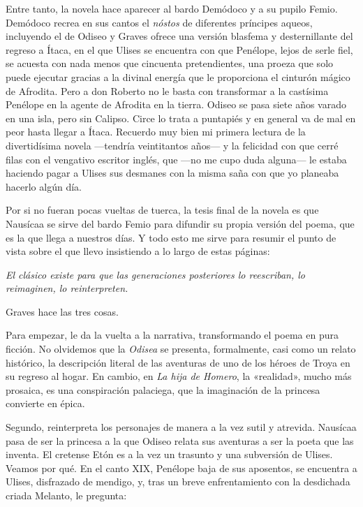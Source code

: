 Entre tanto, la novela hace aparecer al bardo Demódoco y a su pupilo Femio. Demódoco recrea en sus cantos el \emph{nóstos} de diferentes príncipes aqueos, incluyendo el de Odiseo y Graves ofrece una versión blasfema y desternillante del regreso a Ítaca, en el que Ulises se encuentra con que Penélope, lejos de serle fiel, se acuesta con nada menos que cincuenta pretendientes, una proeza que solo puede ejecutar gracias a la divinal energía que le proporciona el cinturón mágico de Afrodita. Pero a don Roberto no le basta con transformar a la castísima Penélope en la agente de Afrodita en la tierra. Odiseo se pasa siete años varado en una isla, pero sin Calipso. Circe lo trata a puntapiés y en general va de mal en peor hasta llegar a Ítaca. Recuerdo muy bien mi primera lectura de la divertidísima novela ---tendría veintitantos años--- y la felicidad con que cerré filas con el vengativo escritor inglés, que ---no me cupo duda alguna--- le estaba haciendo pagar a Ulises sus desmanes con la misma saña con que yo planeaba hacerlo algún día.

Por si no fueran pocas vueltas de tuerca, la tesis final de la novela es que Nausícaa se sirve del bardo Femio para difundir su propia versión del poema, que es la que llega a nuestros días. Y todo esto me sirve para resumir el punto de vista sobre el que llevo insistiendo a lo largo de estas páginas:

\emph{El clásico existe para que las generaciones posteriores lo reescriban, lo reimaginen, lo reinterpreten.}

Graves hace las tres cosas.

Para empezar, le da la vuelta a la narrativa, transformando el poema en pura ficción. No olvidemos que la \emph{Odisea} se presenta, formalmente, casi como un relato histórico, la descripción literal de las aventuras de uno de los héroes de Troya en su regreso al hogar. En cambio, en \emph{La hija de Homero}, la «realidad», mucho más prosaica, es una conspiración palaciega, que la imaginación de la princesa convierte en épica.

Segundo, reinterpreta los personajes de manera a la vez sutil y atrevida. Nausícaa pasa de ser la princesa a la que Odiseo relata sus aventuras a ser la poeta que las inventa. El cretense Etón es a la vez un trasunto y una subversión de Ulises. Veamos por qué. En el canto XIX, Penélope baja de sus aposentos, se encuentra a Ulises, disfrazado de mendigo, y, tras un breve enfrentamiento con la desdichada criada Melanto, le pregunta:


